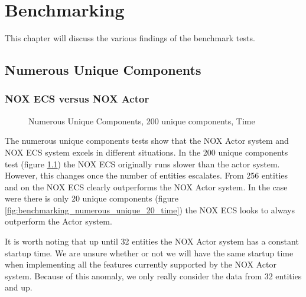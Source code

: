 \chapter{Benchmarking}
\label{chap:benchmarking}
This chapter will discuss the various findings of the benchmark tests.

\section{Numerous Unique Components}
\subsection{NOX ECS versus NOX Actor}
\begin{figure}[H]
\centering
{}
\caption[Numerous Components, ECS versus Actor, 200 Unique Components]{Numerous Unique Components, 200 unique components, Time}
\label{fig:benchmarking_numerous_unique_200_time}
\end{figure}

The numerous unique components tests show that the NOX Actor system and NOX ECS system excels in different situations.
In the 200 unique components test (figure \ref{fig:benchmarking_numerous_unique_200_time}) the NOX ECS originally runs slower than the actor system.
However, this changes once the number of entities escalates. From 256 entities and on the NOX ECS
clearly outperforms the NOX Actor system.
In the case were there is only 20 unique components (figure \ref{fig:benchmarking_numerous_unique_20_time}) the NOX ECS looks to always outperform the Actor system.

It is worth noting that up until 32 entities the NOX Actor system has a constant startup time.
We are unsure whether or not we will have the same startup time when implementing all the features currently
supported by the NOX Actor system.
Because of this anomaly, we only really consider the data from 32 entities and up.

